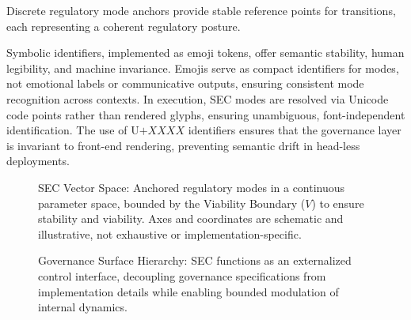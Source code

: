 \documentclass[12pt,a4paper]{article}
\begin{document}
Discrete regulatory mode anchors provide stable reference points for transitions, each representing a coherent regulatory posture.

Symbolic identifiers, implemented as emoji tokens, offer semantic stability, human legibility, and machine invariance. Emojis serve as compact identifiers for modes, not emotional labels or communicative outputs, ensuring consistent mode recognition across contexts. In execution, SEC modes are resolved via Unicode code points rather than rendered glyphs, ensuring unambiguous, font-independent identification. The use of $\text{U+}XXXX$ identifiers ensures that the governance layer is invariant to front-end rendering, preventing semantic drift in head-less deployments.

\begin{figure}[H]
\centering
{}
\caption{SEC Vector Space: Anchored regulatory modes in a continuous parameter space, bounded by the Viability Boundary ($V$) to ensure stability and viability. Axes and coordinates are schematic and illustrative, not exhaustive or implementation-specific.}
\label{fig:sec_vector}
\end{figure}

\begin{figure}[H]
\centering
{}
\caption{Governance Surface Hierarchy: SEC functions as an externalized control interface, decoupling governance specifications from implementation details while enabling bounded modulation of internal dynamics.}
\label{fig:governance_hierarchy}
\end{figure}
\end{document}
